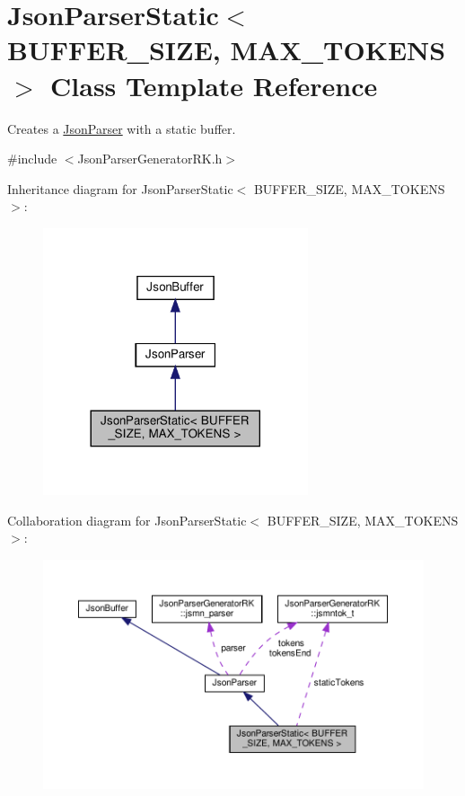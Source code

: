 \hypertarget{class_json_parser_static}{}\section{Json\+Parser\+Static$<$ B\+U\+F\+F\+E\+R\+\_\+\+S\+I\+ZE, M\+A\+X\+\_\+\+T\+O\+K\+E\+NS $>$ Class Template Reference}
\label{class_json_parser_static}


Creates a \hyperlink{class_json_parser}{Json\+Parser} with a static buffer.  




{\ttfamily \#include $<$Json\+Parser\+Generator\+R\+K.\+h$>$}



Inheritance diagram for Json\+Parser\+Static$<$ B\+U\+F\+F\+E\+R\+\_\+\+S\+I\+ZE, M\+A\+X\+\_\+\+T\+O\+K\+E\+NS $>$\+:
\nopagebreak
\begin{figure}[H]
\begin{center}
\leavevmode
\includegraphics[width=221pt]{class_json_parser_static__inherit__graph}
\end{center}
\end{figure}


Collaboration diagram for Json\+Parser\+Static$<$ B\+U\+F\+F\+E\+R\+\_\+\+S\+I\+ZE, M\+A\+X\+\_\+\+T\+O\+K\+E\+NS $>$\+:
\nopagebreak
\begin{figure}[H]
\begin{center}
\leavevmode
\includegraphics[width=350pt]{class_json_parser_static__coll__graph}
\end{center}
\end{figure}
